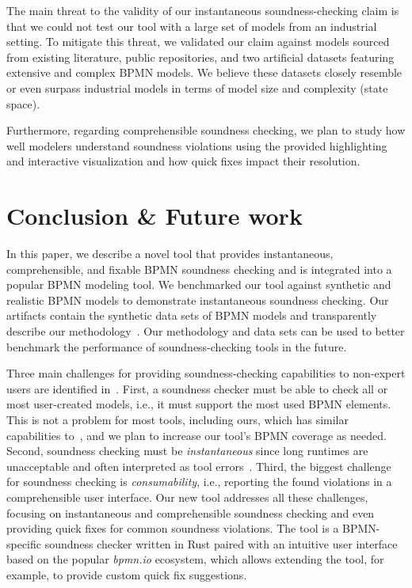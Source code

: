 \documentclass[runningheads]{llncs}
\begin{document}
The main threat to the validity of our instantaneous soundness-checking claim is that we could not test our tool with a large set of models from an industrial setting.
To mitigate this threat, we validated our claim against models sourced from existing literature, public repositories, and two artificial datasets featuring extensive and complex BPMN models.
We believe these datasets closely resemble or even surpass industrial models in terms of model size and complexity (state space).

Furthermore, regarding comprehensible soundness checking, we plan to study how well modelers understand soundness violations using the provided highlighting and interactive visualization and how quick fixes impact their resolution.

\section{Conclusion \& Future work} \label{sec:conclusion}
In this paper, we describe a novel tool that provides instantaneous, comprehensible, and fixable BPMN soundness checking and is integrated into a popular BPMN modeling tool.
We benchmarked our tool against synthetic and realistic BPMN models to demonstrate instantaneous soundness checking.
Our artifacts contain the synthetic data sets of BPMN models and transparently describe our methodology~\cite{noauthorgivenBPM2024Artifacts2024}.
Our methodology and data sets can be used to better benchmark the performance of soundness-checking tools in the future.

Three main challenges for providing soundness-checking capabilities to non-expert users are identified in~\cite{fahlandAnalysisDemandInstantaneous2011}.
First, a soundness checker must be able to check all or most user-created models, i.e., it must support the most used BPMN elements.
This is not a problem for most tools, including ours, which has similar capabilities to~\cite{corradiniFormalApproachAnalysis2021}, and we plan to increase our tool's BPMN coverage as needed.
Second, soundness checking must be \textit{instantaneous} since long runtimes are unacceptable and often interpreted as tool errors~\cite{fahlandAnalysisDemandInstantaneous2011}.
Third, the biggest challenge for soundness checking is \textit{consumability}, i.e., reporting the found violations in a comprehensible user interface.
Our new tool addresses all these challenges, focusing on instantaneous and comprehensible soundness checking and even providing quick fixes for common soundness violations.
The tool is a BPMN-specific soundness checker written in Rust paired with an intuitive user interface based on the popular \textit{bpmn.io} ecosystem, which allows extending the tool, for example, to provide custom quick fix suggestions.
\end{document}
